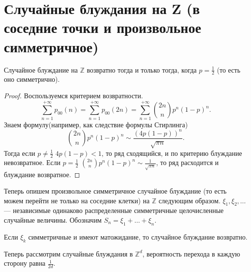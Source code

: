 \section{Случайные блуждания на Z (в соседние точки и произвольное симметричное)}

\begin{theorem} \label{th:Zvoz}
    Случайное блуждание на $\mathbb{Z}$ возвратно тогда и только тогда, когда $p = \frac{1}{2}$ (то есть оно симметрично).
\end{theorem}

\begin{proof}
Воспользуемся критерием возвратности.
    $$\sum\limits_{n=1} ^ {+\infty} p_{00}(n) = \sum\limits_{n=1} ^ {+\infty} p_{00}(2n) = \sum\limits_{n=1} ^ {+\infty} \binom{2n}{n}p^n (1 - p)^n.$$
   Знаем формулу(например, как следствие формулы Стирлинга)
    $$\binom{2n}{n}p^n(1-p)^n \sim \frac{(4p(1-p))^n}{\sqrt{\pi n}}.$$
   Тогда
    если $ p \neq\frac{1}{2}$ $4p(1-p) < 1$, то ряд сходящийся, и по критерию блуждание невозвратное.
Если $ p =\frac{1}{2}$ $\binom{2n}{n}p^n(1-p)^n \sim \frac{1}{\sqrt{\pi n}}$, то ряд расходится и блуждание возвратное.
\end{proof}

Теперь опишем произвольное симметричное случайное блуждание (то есть можем перейти не только на соседние клетки) на $\mathbb{Z}$ следующим образом.
$\xi_1, \xi_2, \ldots$ --- независимые одинаково распределенные симметричные целочисленные случайные величины. Обозначим
$S_n = \xi_1 + \ldots + \xi_n$.

\begin{theorem}
    Если $\xi_k$ симметричные и имеют матожидание, то случайное блуждание возвратно.
\end{theorem}



Теперь рассмотрим случайные блуждания в $\mathbb{Z}^d$, вероятность перехода  в каждую сторону равна $\frac{1}{2d}$.
\newpage
